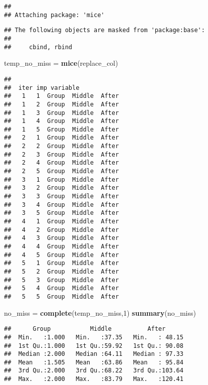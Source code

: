 \documentclass[
]{article}
\newenvironment{Shaded}{\begin{snugshade}}{\end{snugshade}}
\newcommand{\DecValTok}[1]{\textcolor[rgb]{0.00,0.00,0.81}{#1}}
\newcommand{\KeywordTok}[1]{\textcolor[rgb]{0.13,0.29,0.53}{\textbf{#1}}}
\newcommand{\NormalTok}[1]{#1}
\newcommand{\StringTok}[1]{\textcolor[rgb]{0.31,0.60,0.02}{#1}}
\begin{document}
\begin{verbatim}
## 
## Attaching package: 'mice'
\end{verbatim}

\begin{verbatim}
## The following objects are masked from 'package:base':
## 
##     cbind, rbind
\end{verbatim}

\begin{Shaded}
\begin{Highlighting}[]
\NormalTok{temp_no_miss =}\StringTok{ }\KeywordTok{mice}\NormalTok{(replace_col)}
\end{Highlighting}
\end{Shaded}

\begin{verbatim}
## 
##  iter imp variable
##   1   1  Group  Middle  After
##   1   2  Group  Middle  After
##   1   3  Group  Middle  After
##   1   4  Group  Middle  After
##   1   5  Group  Middle  After
##   2   1  Group  Middle  After
##   2   2  Group  Middle  After
##   2   3  Group  Middle  After
##   2   4  Group  Middle  After
##   2   5  Group  Middle  After
##   3   1  Group  Middle  After
##   3   2  Group  Middle  After
##   3   3  Group  Middle  After
##   3   4  Group  Middle  After
##   3   5  Group  Middle  After
##   4   1  Group  Middle  After
##   4   2  Group  Middle  After
##   4   3  Group  Middle  After
##   4   4  Group  Middle  After
##   4   5  Group  Middle  After
##   5   1  Group  Middle  After
##   5   2  Group  Middle  After
##   5   3  Group  Middle  After
##   5   4  Group  Middle  After
##   5   5  Group  Middle  After
\end{verbatim}

\begin{Shaded}
\begin{Highlighting}[]
\NormalTok{no_miss =}\StringTok{ }\KeywordTok{complete}\NormalTok{(temp_no_miss,}\DecValTok{1}\NormalTok{)}
\KeywordTok{summary}\NormalTok{(no_miss)}
\end{Highlighting}
\end{Shaded}

\begin{verbatim}
##      Group           Middle          After       
##  Min.   :1.000   Min.   :37.35   Min.   : 48.15  
##  1st Qu.:1.000   1st Qu.:59.92   1st Qu.: 90.08  
##  Median :2.000   Median :64.11   Median : 97.33  
##  Mean   :1.505   Mean   :63.86   Mean   : 95.84  
##  3rd Qu.:2.000   3rd Qu.:68.22   3rd Qu.:103.64  
##  Max.   :2.000   Max.   :83.79   Max.   :120.41
\end{verbatim}
\end{document}
